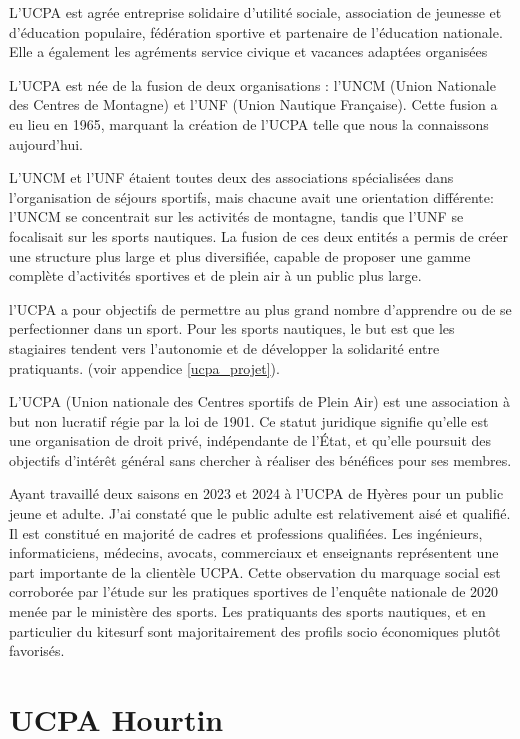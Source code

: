 \documentclass[11pt,a4paper]{report}
\begin{document}
L’UCPA est agrée entreprise solidaire d’utilité sociale, association de
jeunesse et d’éducation populaire, fédération sportive et partenaire de 
l’éducation nationale. Elle a également les agréments service civique et
vacances adaptées organisées

L'UCPA est  née de la fusion de deux organisations : l'UNCM 
(Union Nationale des Centres de Montagne)
et l'UNF (Union Nautique Française). Cette fusion a eu lieu en
1965, marquant la création de l'UCPA telle que nous la connaissons
aujourd'hui.

L'UNCM et l'UNF étaient toutes deux des associations spécialisées
dans l'organisation de séjours sportifs, mais chacune avait une
orientation différente: l'UNCM se concentrait sur les activités 
de montagne, tandis que l'UNF se focalisait sur les sports nautiques. 
La fusion de ces deux entités a permis de créer une structure plus 
large et plus diversifiée, capable de proposer une gamme complète 
d'activités sportives et de plein air à un public plus large.

l'UCPA a pour objectifs de permettre au plus grand nombre
d'apprendre ou de se perfectionner dans un sport.
Pour les sports nautiques, le but est que les stagiaires
tendent vers l'autonomie  et de développer la solidarité entre pratiquants.
(voir appendice \ref{ucpa_projet}).


L'UCPA (Union nationale des Centres sportifs de Plein Air) est une association
à but non lucratif régie par la loi de 1901. Ce statut juridique signifie
qu'elle est une organisation de droit privé, indépendante de l'État, et 
qu'elle poursuit des objectifs d'intérêt général sans chercher à 
réaliser des bénéfices pour ses membres.

Ayant travaillé deux saisons en 2023 et 2024 à l'UCPA de Hyères pour 
un public jeune et adulte. J'ai  constaté que le public 
adulte est relativement aisé et qualifié. Il est
constitué en majorité de cadres et professions qualifiées. Les
ingénieurs, informaticiens, médecins, avocats, commerciaux et enseignants
représentent une part importante de la clientèle UCPA.
Cette observation du marquage social  est corroborée par l'étude sur 
les pratiques sportives de l'enqu\^ete nationale de
2020 menée par le ministère des sports\cite{injep}. Les pratiquants
des sports nautiques, et en particulier du kitesurf sont majoritairement
des profils socio économiques plut\^ot favorisés.


\section{UCPA Hourtin}
\end{document}
